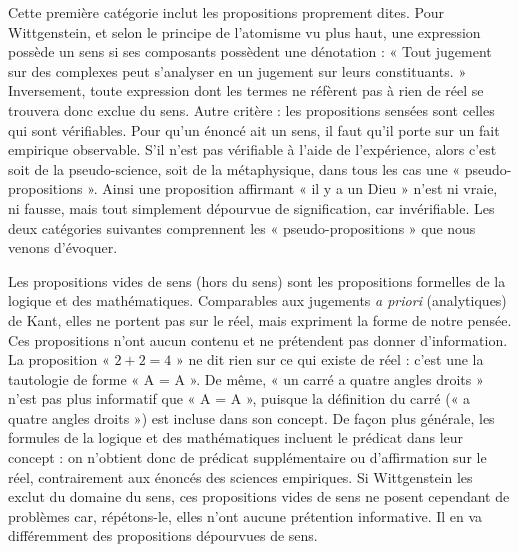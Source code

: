 Cette première catégorie inclut les propositions proprement dites. Pour Wittgenstein, et selon le principe de l’atomisme vu plus haut, une expression possède un sens si ses composants possèdent une dénotation : « Tout jugement sur des complexes peut s’analyser en un jugement sur leurs constituants. » Inversement, toute expression dont les termes ne réfèrent pas à rien de réel se trouvera donc exclue du sens. Autre critère : les propositions sensées sont celles qui sont vérifiables. Pour qu’un énoncé ait un sens, il faut qu’il porte sur un fait empirique observable. S’il n’est pas vérifiable à l’aide de l’expérience, alors c’est soit de la pseudo-science, soit de la métaphysique, dans tous les cas une « pseudo-propositions ». Ainsi une proposition affirmant « il y a un Dieu » n’est ni vraie, ni fausse, mais tout simplement dépourvue de signification, car invérifiable. Les deux catégories suivantes comprennent les « pseudo-propositions » que nous venons d’évoquer.

Les propositions vides de sens (hors du sens) sont les propositions formelles de la logique et des mathématiques. Comparables aux jugements \textit{a priori} (analytiques) de Kant, elles ne portent pas sur le réel, mais expriment la forme de notre pensée. Ces propositions n’ont aucun contenu et ne prétendent pas donner d’information. La proposition « $2+2=4$ » ne dit rien sur ce qui existe de réel : c’est une la tautologie de forme « A = A ». De même, « un carré a quatre angles droits » n’est pas plus informatif que « A = A », puisque la définition du carré (« a quatre angles droits ») est incluse dans son concept. De façon plus générale, les formules de la logique et des mathématiques incluent le prédicat dans leur concept : on n’obtient donc de prédicat supplémentaire ou d’affirmation sur le réel, contrairement aux énoncés des sciences empiriques. Si Wittgenstein les exclut du domaine du sens, ces propositions vides de sens ne posent cependant de problèmes car, répétons-le, elles n’ont aucune prétention informative. Il en va différemment des propositions dépourvues de sens.

